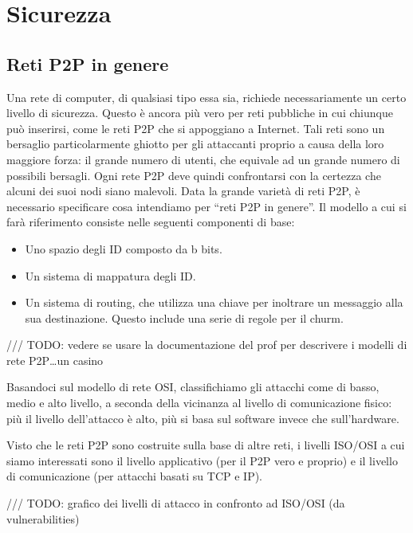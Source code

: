 \chapter{Sicurezza}\label{sicurezza}

\section{Reti P2P in genere}\label{reti-p2p-in-genere}

Una rete di computer, di qualsiasi tipo essa sia, richiede    necessariamente un certo livello di sicurezza. Questo è ancora più vero per reti pubbliche in cui chiunque può inserirsi, come le reti P2P che
si appoggiano a Internet. 
Tali reti sono un bersaglio particolarmente ghiotto per gli attaccanti proprio a causa della loro maggiore forza: il grande numero di utenti,
che equivale ad un grande numero di possibili bersagli. Ogni rete P2P deve quindi confrontarsi con la certezza che alcuni dei suoi nodi siano
malevoli.  Data la grande varietà di reti P2P, è necessario specificare cosa intendiamo per ``reti P2P in genere''. Il modello \cite{vulenrabilities} a cui si farà riferimento consiste nelle seguenti componenti di base:

\begin{itemize}
\itemsep1pt\parskip0pt
\item
  Uno spazio degli ID composto da b bits.
\item
  Un sistema di mappatura degli ID.
\item
  Un sistema di routing, che utilizza una chiave per inoltrare un   messaggio alla sua destinazione. Questo include una serie di regole   per il churm.
\end{itemize}

/// TODO: vedere se usare la documentazione del prof per descrivere i modelli di rete P2P\ldots{}un casino

Basandoci sul modello di rete OSI, classifichiamo gli attacchi come di basso, medio e alto livello, a seconda della vicinanza al livello di comunicazione fisico: più il livello dell'attacco è alto, più si basa sul software invece che sull'hardware.

Visto che le reti P2P sono costruite sulla base di altre reti, i livelli ISO/OSI a cui siamo interessati sono il livello applicativo (per il P2P vero e proprio) e il livello di comunicazione (per attacchi basati su TCP e IP).

/// TODO: grafico dei livelli di attacco in confronto ad ISO/OSI (da vulnerabilities)


